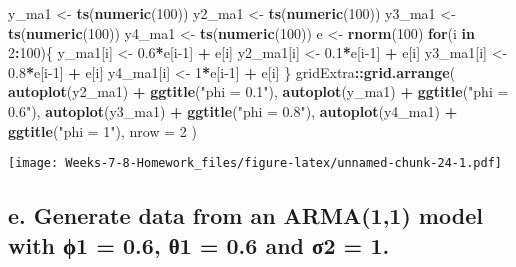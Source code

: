 \documentclass[]{article}
\newenvironment{Shaded}{\begin{snugshade}}{\end{snugshade}}
\newcommand{\ControlFlowTok}[1]{\textcolor[rgb]{0.13,0.29,0.53}{\textbf{#1}}}
\newcommand{\DataTypeTok}[1]{\textcolor[rgb]{0.13,0.29,0.53}{#1}}
\newcommand{\DecValTok}[1]{\textcolor[rgb]{0.00,0.00,0.81}{#1}}
\newcommand{\FloatTok}[1]{\textcolor[rgb]{0.00,0.00,0.81}{#1}}
\newcommand{\KeywordTok}[1]{\textcolor[rgb]{0.13,0.29,0.53}{\textbf{#1}}}
\newcommand{\NormalTok}[1]{#1}
\newcommand{\OperatorTok}[1]{\textcolor[rgb]{0.81,0.36,0.00}{\textbf{#1}}}
\newcommand{\StringTok}[1]{\textcolor[rgb]{0.31,0.60,0.02}{#1}}
\begin{document}
\begin{Shaded}
\begin{Highlighting}[]
\NormalTok{y_ma1 <-}\StringTok{ }\KeywordTok{ts}\NormalTok{(}\KeywordTok{numeric}\NormalTok{(}\DecValTok{100}\NormalTok{))}
\NormalTok{y2_ma1 <-}\StringTok{ }\KeywordTok{ts}\NormalTok{(}\KeywordTok{numeric}\NormalTok{(}\DecValTok{100}\NormalTok{))}
\NormalTok{y3_ma1 <-}\StringTok{ }\KeywordTok{ts}\NormalTok{(}\KeywordTok{numeric}\NormalTok{(}\DecValTok{100}\NormalTok{))}
\NormalTok{y4_ma1 <-}\StringTok{ }\KeywordTok{ts}\NormalTok{(}\KeywordTok{numeric}\NormalTok{(}\DecValTok{100}\NormalTok{))}
\NormalTok{e <-}\StringTok{ }\KeywordTok{rnorm}\NormalTok{(}\DecValTok{100}\NormalTok{)}
\ControlFlowTok{for}\NormalTok{(i }\ControlFlowTok{in} \DecValTok{2}\OperatorTok{:}\DecValTok{100}\NormalTok{)\{}
\NormalTok{  y_ma1[i] <-}\StringTok{ }\FloatTok{0.6}\OperatorTok{*}\NormalTok{e[i}\DecValTok{-1}\NormalTok{] }\OperatorTok{+}\StringTok{ }\NormalTok{e[i]}
\NormalTok{  y2_ma1[i] <-}\StringTok{ }\FloatTok{0.1}\OperatorTok{*}\NormalTok{e[i}\DecValTok{-1}\NormalTok{] }\OperatorTok{+}\StringTok{ }\NormalTok{e[i]}
\NormalTok{  y3_ma1[i] <-}\StringTok{ }\FloatTok{0.8}\OperatorTok{*}\NormalTok{e[i}\DecValTok{-1}\NormalTok{] }\OperatorTok{+}\StringTok{ }\NormalTok{e[i]}
\NormalTok{  y4_ma1[i] <-}\StringTok{ }\DecValTok{1}\OperatorTok{*}\NormalTok{e[i}\DecValTok{-1}\NormalTok{] }\OperatorTok{+}\StringTok{ }\NormalTok{e[i]}
\NormalTok{\}}
\NormalTok{gridExtra}\OperatorTok{::}\KeywordTok{grid.arrange}\NormalTok{(}
  \KeywordTok{autoplot}\NormalTok{(y2_ma1) }\OperatorTok{+}\StringTok{ }\KeywordTok{ggtitle}\NormalTok{(}\StringTok{"phi = 0.1"}\NormalTok{),}
  \KeywordTok{autoplot}\NormalTok{(y_ma1) }\OperatorTok{+}\StringTok{ }\KeywordTok{ggtitle}\NormalTok{(}\StringTok{"phi = 0.6"}\NormalTok{),}
  \KeywordTok{autoplot}\NormalTok{(y3_ma1) }\OperatorTok{+}\StringTok{ }\KeywordTok{ggtitle}\NormalTok{(}\StringTok{"phi = 0.8"}\NormalTok{),}
  \KeywordTok{autoplot}\NormalTok{(y4_ma1) }\OperatorTok{+}\StringTok{ }\KeywordTok{ggtitle}\NormalTok{(}\StringTok{"phi = 1"}\NormalTok{), }\DataTypeTok{nrow =} \DecValTok{2}
\NormalTok{)}
\end{Highlighting}
\end{Shaded}

\texttt{[image: Weeks-7-8-Homework\_files/figure-latex/unnamed-chunk-24-1.pdf]}

\hypertarget{e.-generate-data-from-an-arma11-model-with-1-0.6-1-0.6-and-2-1.}{%
\subsection{e. Generate data from an ARMA(1,1) model with ϕ1 = 0.6, θ1 =
0.6 and σ2 =
1.}\label{e.-generate-data-from-an-arma11-model-with-1-0.6-1-0.6-and-2-1.}}
\end{document}

